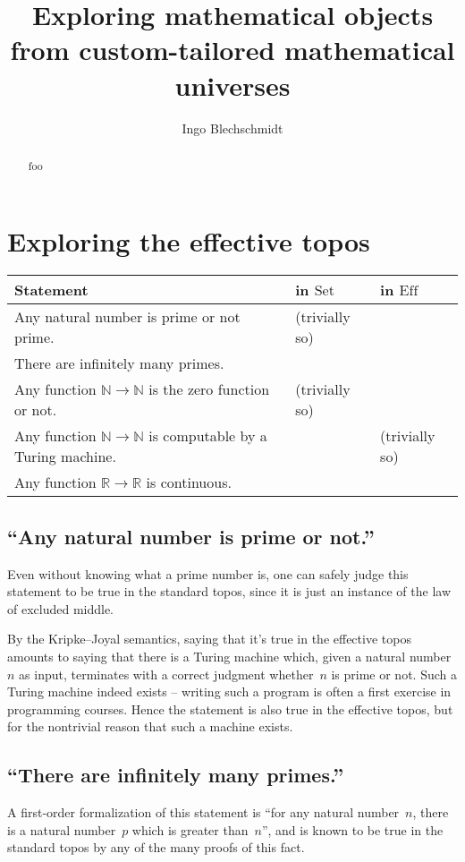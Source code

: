 \documentclass[oneside]{amsart}
\title[]{Exploring mathematical objects from custom-tailored mathematical universes}
\author{Ingo Blechschmidt}
\newcommand{\cmark}{\ding{51}}
\newcommand{\xmark}{\ding{55}}
\theoremstyle{definition}
\theoremstyle{plain}
\theoremstyle{remark}
\newcommand{\NN}{\mathbb{N}}
\newcommand{\RR}{\mathbb{R}}
\newcommand{\Set}{\mathrm{Set}}
\newcommand{\Eff}{\mathrm{Ef{}f}}
\renewcommand{\_}{\mathpunct{.}\,}
\newcommand{\effective}{ef{}fective\xspace}
\newcommand{\?}{\,{:}\,}
\begin{document}
\begin{abstract}
  foo
\end{abstract}

\maketitle
\thispagestyle{empty}

\noindent


\section{Exploring the \effective topos}


\begin{tabular}{lll}
  \toprule
  Statement & in $\Set$ & in $\Eff$ \\
  \midrule
  Any natural number is prime or not prime. & \cmark{} (trivially so) & \cmark \\
  There are infinitely many primes. & \cmark & \cmark \\
  Any function $\NN \to \NN$ is the zero function or not. & \cmark{} (trivially so) & \xmark \\
  Any function $\NN \to \NN$ is computable by a Turing machine. & \xmark & \cmark{} (trivially so) \\
  Any function $\RR \to \RR$ is continuous. & \xmark & \cmark \\
  \bottomrule
\end{tabular}

\subsection*{``Any natural number is prime or not.''} Even without knowing what
a prime number is, one can safely judge this statement to be true in
the standard topos, since it is just an instance of the law of excluded middle.

By the Kripke--Joyal semantics, saying that it's true in the \effective topos
amounts to saying that there is a Turing machine which, given a natural
number~$n$ as input, terminates with a correct judgment whether~$n$ is prime or
not. Such a Turing machine indeed exists -- writing such a program is often a
first exercise in programming courses. Hence the statement is also true in the
\effective topos, but for the nontrivial reason that such a machine exists.


\subsection*{``There are infinitely many primes.''} A first-order formalization
of this statement is ``for any natural number~$n$, there is a natural
number~$p$ which is greater than~$n$'', and is known to be true in the standard
topos by any of the many proofs of this fact.
\end{document}
